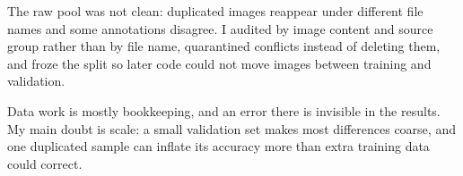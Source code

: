 \documentclass[lettersize,journal]{IEEEtran}
\begin{document}
The raw pool was not clean: duplicated images reappear under different file names and some annotations disagree. I audited by image content and source group rather than by file name, quarantined conflicts instead of deleting them, and froze the split so later code could not move images between training and validation.

Data work is mostly bookkeeping, and an error there is invisible in the results. My main doubt is scale: a small validation set makes most differences coarse, and one duplicated sample can inflate its accuracy more than extra training data could correct.
\end{document}
